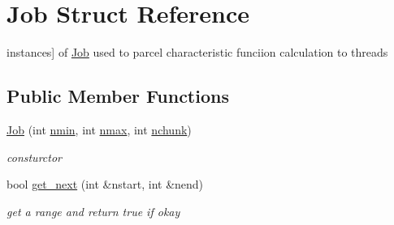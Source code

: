\hypertarget{structJob}{}\section{Job Struct Reference}
\label{structJob}


instances\mbox{]} of \mbox{\hyperlink{structJob}{Job}} used to parcel characteristic funciion calculation to threads  


\subsection*{Public Member Functions}
\begin{DoxyCompactItemize}
\item 
\mbox{\hyperlink{structJob_a07028ffb884f458a79269b80c372fe3e}{Job}} (int \mbox{\hyperlink{structJob_ac0ad3904b198ae1447abd16e1108a14c}{nmin}}, int \mbox{\hyperlink{structJob_abb2b05e989a4838a3a0c5807340282ac}{nmax}}, int \mbox{\hyperlink{structJob_a4fa956498fa1a349492dc9ab383b7bc4}{nchunk}})
\begin{DoxyCompactList}\small\item\em consturctor \end{DoxyCompactList}\item 
bool \mbox{\hyperlink{structJob_a45a93802141c9b36cb32778fb404535d}{get\+\_\+next}} (int \&nstart, int \&nend)
\begin{DoxyCompactList}\small\item\em get a range and return true if okay \end{DoxyCompactList}\end{DoxyCompactItemize}
